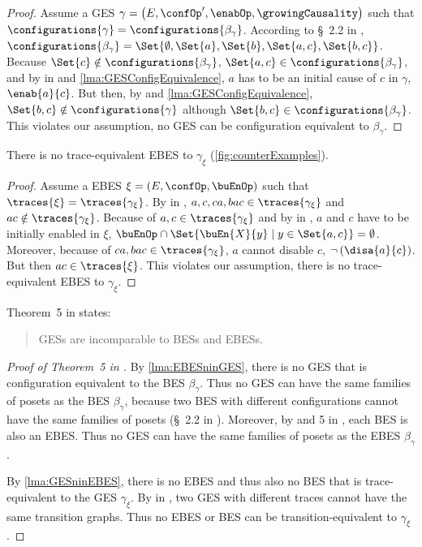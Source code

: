 \documentclass[runningheads,a4paper]{llncs}
\begin{document}
\begin{proof}
	Assume a GES $ \gamma = \left( E, \confOp', \enabOp, \growingCausality \right) $ such that $ \configurations{\gamma} = \configurations{\beta_\gamma} $.	According to \S~2.2 in \cite{dynamicCausality15}, $ \configurations{\beta_\gamma} = \Set{\emptyset, \Set{ a }, \Set{ b }, \Set{ a, c }, \Set{ b, c } } $. Because $ \Set{ c } \notin \configurations{\beta_\gamma} $, $ \Set{ a, c } \in \configurations{\beta_\gamma} $, and by  in \cite{dynamicCausality15} and \lem\ref{lma:GESConfigEquivalence}, $ a $ has to be an initial cause of $ c $ in $ \gamma $, \ie $ \enab{a}{c} $.	But then, by  and \lem\ref{lma:GESConfigEquivalence}, $ \Set{ b, c } \notin \configurations{\gamma} $ although $ \Set{ b, c } \in \configurations{\beta_\gamma} $. This violates our assumption, \ie no GES can be configuration equivalent to $ \beta_\gamma $.
\end{proof}
\begin{lemma}\label{lma:GESninEBES}
	There is no trace-equivalent EBES to $\gamma_\xi$ (\cf \fig\ref{fig:counterExamples}).
\end{lemma}
\begin{proof}
	Assume a EBES $ \xi = \left( E, \confOp, \buEnOp \right) $ such that $ \traces{\xi} = \traces{\gamma_\xi} $. By  in \cite{dynamicCausality15}, $ a, c, ca, bac \in \traces{\gamma_\xi} $ and $ ac \notin \traces{\gamma_\xi} $. Because of $ a, c \in \traces{\gamma_\xi} $ and by  in \cite{dynamicCausality15}, $ a $ and $ c $ have to be initially enabled in $ \xi $, \ie $ \buEnOp \cap \Set{ \buEn{X}{y} \mid y \in \Set{ a, c } } = \emptyset $.	Moreover, because of $ ca, bac \in \traces{\gamma_\xi} $, $ a $ cannot disable $ c $, \ie $ \neg \left( \disa{a}{c} \right) $. But then $ ac \in \traces{\xi} $. This violates our assumption, \ie there is no trace-equivalent EBES to $ \gamma_\xi $.
\end{proof}
Theorem~5 in \cite{dynamicCausality15} states:
\begin{quote}
	GESs are incomparable to BESs and EBESs.
\end{quote}

\begin{proof}[Proof of Theorem~5 in \cite{dynamicCausality15}]
	By \lem\ref{lma:EBESninGES}, there is no GES that is configuration equivalent
	to the BES $ \beta_\gamma $. Thus no GES can have the same families of posets
	as the BES $ \beta_\gamma $, because two BES with different configurations
	cannot have the same families of posets (\cf \S~2.2 in \cite{dynamicCausality15}). Moreover, by  and 5 in \cite{dynamicCausality15}, each BES is also an EBES. Thus no GES can have the same families of posets as the EBES $ \beta_\gamma $.
	
	By \lem\ref{lma:GESninEBES}, there is no EBES and thus also no BES that is trace-equivalent to the GES $ \gamma_\xi $. By  in \cite{dynamicCausality15}, two GES with different traces cannot have the same transition graphs. Thus no EBES or BES can be transition-equivalent to $ \gamma_\xi $.
\end{proof}
\end{document}
